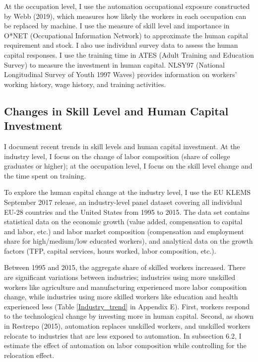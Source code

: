 \documentclass[12pt]{article}
\begin{document}
At the occupation level, I use the automation occupational exposure constructed by Webb (2019)\nocite{Webb2019}, which measures how likely the workers in each occupation can be replaced by machine. I use the measure of skill level and importance in O*NET (Occupational Information Network) to approximate the human capital requirement and stock. I also use individual survey data to assess the human capital responses. I use the training time in ATES (Adult Training and Education Survey) to measure the investment in human capital. NLSY97 (National Longitudinal Survey of Youth 1997 Waves) provides information on workers' working history, wage history, and training activities. 

\subsection{Changes in Skill Level and Human Capital Investment}
I document recent trends in skill levels and human capital investment. At the industry level, I focus on the change of labor composition (share of college graduates or higher); at the occupation level, I focus on the skill level change and the time spent on training. 
 
To explore the human capital change at the industry level, I use the EU KLEMS September 2017 release, an industry-level panel dataset covering all individual EU-28 countries and the United States from 1995 to 2015. The data set contains statistical data on the economic growth (value added, compensation to capital and labor, etc.) and labor market composition (compensation and employment share for high/medium/low educated workers), and analytical data on the growth factors (TFP, capital services, hours worked, labor composition, etc.). 

Between 1995 and 2015, the aggregate share of skilled workers increased. There are significant variations between industries; industries using more unskilled workers like agriculture and manufacturing experienced more labor composition change, while industries using more skilled workers like education and health experienced less (Table \ref{Industry_trend} in Appendix E). First, workers respond to the technological change by investing more in human capital. Second, as shown in Restrepo (2015)\nocite{Restrepo2015}, automation replaces unskilled workers, and unskilled workers relocate to industries that are less exposed to automation. In subsection 6.2, I estimate the effect of automation on labor composition while controlling for the relocation effect. 
\end{document}
